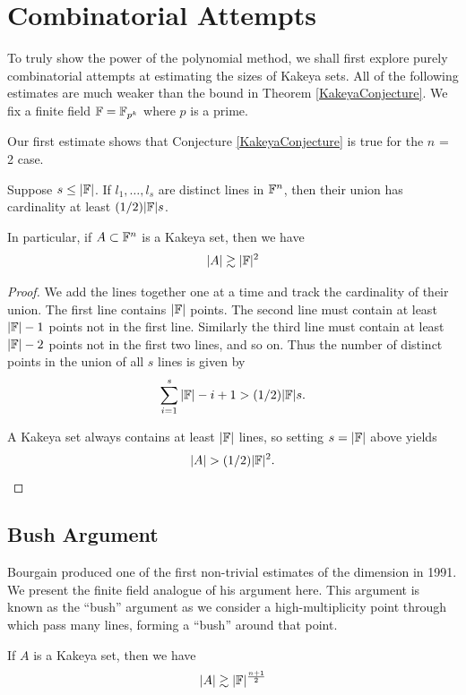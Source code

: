 \section{Combinatorial Attempts}
To truly show the power of the polynomial method, we shall first explore purely combinatorial attempts 
at estimating the sizes of Kakeya sets. All of the following estimates are much weaker than the bound in Theorem \ref{KakeyaConjecture}.
We fix a finite field $\mathbb F = \mathbb F_{p^k}$ where $p$ is a prime. 

Our first estimate shows that Conjecture \ref{KakeyaConjecture} is true for the $n$ = 2 case.

\begin{lemma}
    Suppose $s \leq |\mathbb F|$. If $l_1, \dots, l_s$ are distinct lines in $\mathbb F^n$, then their union has cardinality at least $(1/2)|\mathbb F|s$. 

    In particular, if $A \subset \mathbb F^n$ is a Kakeya set, then we have
    \[
      |A| \gtrsim |\mathbb F|^2  
    \] \label{lem:kak-first-estimate}
\end{lemma} 
\begin{proof}
    We add the lines together one at a time and track the cardinality of their union. The first line contains $|\mathbb F|$ points. The second line must contain at least $|\mathbb F| -1$ points not in the first line. Similarly the third line must contain at least $|\mathbb F| -2$ points not in the first two lines, and so on. Thus the number of distinct points in the union of all $s$ lines is given by
    \[
      \sum_{i=1}^{s} |\mathbb F| - i + 1  > (1/2) |\mathbb F| s.
    \]

    A Kakeya set always contains at least $|\mathbb F|$ lines, so setting $s=|\mathbb F|$ above yields
    \[
        |A| > (1/2) |\mathbb F|^2 .
    \]

\end{proof}

\subsection{Bush Argument} 
Bourgain produced one of the first non-trivial estimates of the dimension in 1991.\cite{BUSH1991} We present the finite field analogue of his argument here.\cite{GUTH2016} This argument is known as the ``bush'' argument as we consider a high-multiplicity point through which pass many lines, forming a ``bush'' around that point. 


\begin{theorem}

If $A$ is a Kakeya set, then we have
$$|A| \gtrsim |\mathbb F|^{\frac{n+1}{2}}$$
\end{theorem}

